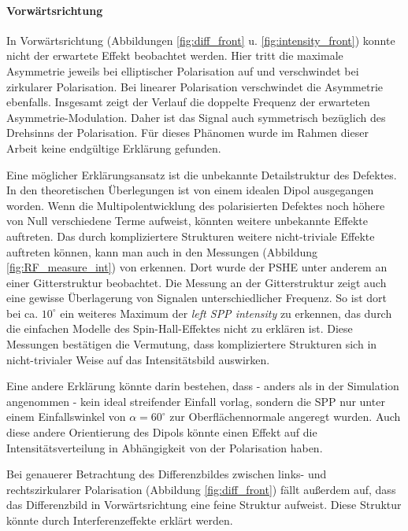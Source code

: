 \documentclass[titlepage]{article}
\begin{document}
	\paragraph{Vorwärtsrichtung}
	In Vorwärtsrichtung (Abbildungen \ref{fig:diff_front} u. \ref{fig:intensity_front}) konnte nicht der erwartete Effekt beobachtet werden. Hier tritt die maximale Asymmetrie jeweils bei elliptischer Polarisation auf und verschwindet bei zirkularer Polarisation. Bei linearer Polarisation verschwindet die Asymmetrie ebenfalls. Insgesamt zeigt der Verlauf die doppelte Frequenz der erwarteten Asymmetrie-Modulation. Daher ist das Signal auch symmetrisch bezüglich des Drehsinns der Polarisation. Für dieses Phänomen wurde im Rahmen dieser Arbeit keine endgültige Erklärung gefunden.
	
	Eine möglicher Erklärungsansatz ist die unbekannte Detailstruktur des Defektes. In den theoretischen Überlegungen ist von einem idealen Dipol ausgegangen worden. Wenn die Multipolentwicklung des polarisierten Defektes noch höhere von Null verschiedene Terme aufweist, könnten weitere unbekannte Effekte auftreten. Das durch kompliziertere Strukturen weitere nicht-triviale Effekte auftreten können, kann man auch in den Messungen (Abbildung \ref{fig:RF_measure_int}) von \cite{RodriguezFortuno.2013} erkennen. Dort wurde der PSHE unter anderem an einer Gitterstruktur beobachtet. Die Messung an der Gitterstruktur zeigt auch eine gewisse Überlagerung von Signalen unterschiedlicher Frequenz. So ist dort bei ca. $10^\circ$ ein weiteres Maximum der \textit{left SPP intensity} zu erkennen, das durch die einfachen Modelle des Spin-Hall-Effektes nicht zu erklären ist. Diese Messungen bestätigen die Vermutung, dass kompliziertere Strukturen sich in nicht-trivialer Weise auf das Intensitätsbild auswirken.
	
	Eine andere Erklärung könnte darin bestehen, dass - anders als in der Simulation angenommen - kein ideal streifender Einfall vorlag, sondern die SPP  nur unter einem Einfallswinkel von $\alpha = 60^\circ$ zur Oberflächennormale angeregt wurden.  Auch diese andere Orientierung des Dipols könnte einen Effekt auf die Intensitätsverteilung in Abhängigkeit von der Polarisation haben.
	
	Bei genauerer Betrachtung des Differenzbildes zwischen links- und rechtszirkularer Polarisation (Abbildung \ref{fig:diff_front}) fällt außerdem auf, dass das Differenzbild in Vorwärtsrichtung eine feine Struktur aufweist. Diese Struktur könnte durch Interferenzeffekte erklärt werden.
\end{document}
